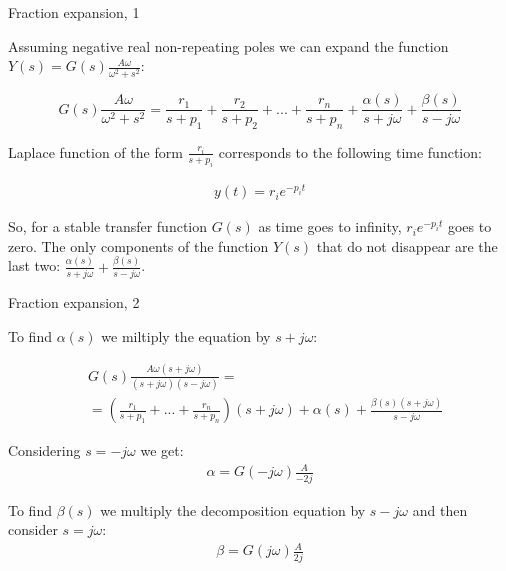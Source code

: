 \documentclass{beamer}
\begin{document}
\begin{frame}{Fraction expansion, 1}
	\begin{flushleft}
		
		Assuming negative real non-repeating poles we can expand the function $Y(s) = G(s)\frac{A \omega}{\omega^2 + s^2}$:
		
		\begin{equation*}
			G(s)\frac{A \omega}{\omega^2 + s^2} = \frac{r_1}{s + p_1} + \frac{r_2}{s + p_2} + ... + \frac{r_n}{s + p_n} + \frac{\alpha(s)}{s + j\omega} + \frac{\beta(s)}{s - j\omega}
		\end{equation*}		
	
		Laplace function of the form $\frac{r_i}{s + p_i}$ corresponds to the following time function:
		
		\begin{align}
			y(t) = r_i e^{-p_i t}
		\end{align} 
	
		So, for a stable transfer function $G(s)$ as time goes to infinity, $r_i e^{-p_i t}$ goes to zero. The only components of the function $Y(s)$ that do not disappear are the last two: $\frac{\alpha(s)}{s + j\omega} + \frac{\beta(s)}{s - j\omega}$.
		
		
	\end{flushleft}
\end{frame}



\begin{frame}{Fraction expansion, 2}
	\begin{flushleft}
		
		To find $\alpha(s)$ we miltiply the equation by $s + j\omega$:
		
		\begin{align*}
			&G(s)\frac{A \omega (s + j\omega)}{(s + j\omega)(s - j\omega)} 
			= \\
			&=
			\left( \frac{r_1}{s + p_1} + ... + \frac{r_n}{s + p_n} \right) (s + j\omega) 
			+ 
			\alpha(s) + \frac{\beta(s)(s + j\omega)}{s - j\omega}
		\end{align*}		
		
		Considering $s = -j\omega$ we get:
		\begin{align}
			\alpha = G(-j\omega)\frac{A }{-2j} 
		\end{align}
		
		To find $\beta(s)$ we multiply the decomposition equation by  $s - j\omega$ and then consider $s = j\omega$:
		\begin{align}
			\beta = G(j\omega)\frac{A}{2j} 
		\end{align}
		
	\end{flushleft}
\end{frame}
\end{document}
